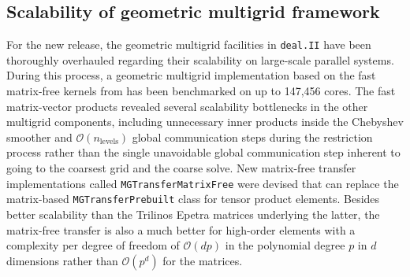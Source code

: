 \documentclass{ansarticle-preprint}
\newcommand{\specialword}[1]{\texttt{#1}}
\newcommand{\dealii}{{\specialword{deal.II}}}
\begin{document}
\subsection{Scalability of geometric multigrid framework}

For the new release, the geometric multigrid facilities in \dealii{} have been
thoroughly overhauled regarding their scalability on large-scale parallel
systems. During this process, a geometric multigrid implementation based on
the fast matrix-free kernels from \cite{KronbichlerKormann2012} has been
benchmarked on up to 147,456 cores. The fast matrix-vector products revealed
several scalability bottlenecks in the other multigrid components, including
unnecessary inner products inside the Chebyshev smoother and
$\mathcal O(n_\text{levels})$ global communication steps during the
restriction process rather than the single unavoidable global communication
step inherent to going to the coarsest grid and the coarse solve. New
matrix-free transfer implementations called \texttt{MGTransferMatrixFree} were
devised that can replace the matrix-based \texttt{MGTransferPrebuilt} class
for tensor product elements. Besides better scalability than the Trilinos
Epetra matrices underlying the latter, the matrix-free transfer is also a much
better for high-order elements with a complexity per degree of freedom of
$\mathcal O(d p)$ in the polynomial degree $p$ in $d$ dimensions rather than
$\mathcal O(p^d)$ for the matrices.
\end{document}
